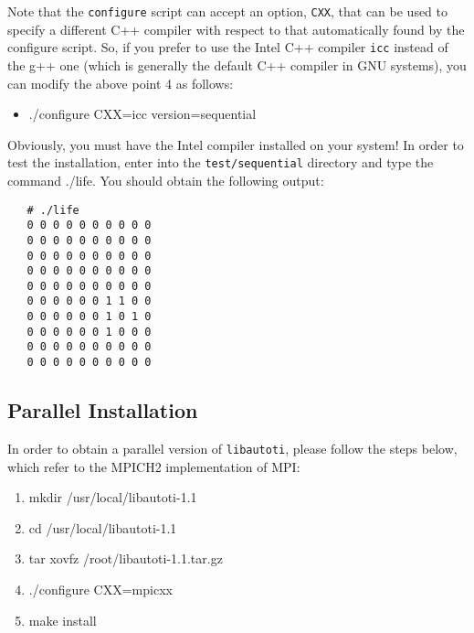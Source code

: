 Note that the \verb"configure" script can accept an option,
\verb"CXX", that can be used to specify a different C++ compiler
with respect to that automatically found by the configure script.
So, if you prefer to use the Intel C++ compiler \verb"icc" instead
of the g++ one (which is generally the default C++ compiler in GNU
systems), you can modify the above point 4 as follows:
\begin{itemize}
    \item ./configure CXX=icc version=sequential
\end{itemize}
Obviously, you must have the Intel compiler installed on your
system! In order to test the installation, enter into the
\verb"test/sequential" directory and type the command ./life. You
should obtain the following output:

\begin{verbatim}
   # ./life
   0 0 0 0 0 0 0 0 0 0
   0 0 0 0 0 0 0 0 0 0
   0 0 0 0 0 0 0 0 0 0
   0 0 0 0 0 0 0 0 0 0
   0 0 0 0 0 0 0 0 0 0
   0 0 0 0 0 0 1 1 0 0
   0 0 0 0 0 0 1 0 1 0
   0 0 0 0 0 0 1 0 0 0
   0 0 0 0 0 0 0 0 0 0
   0 0 0 0 0 0 0 0 0 0
\end{verbatim}

\subsection{Parallel Installation}\label{sec:parallel_installation}

In order to obtain a parallel version of \verb"libautoti", please
follow the steps below, which refer to the MPICH2 implementation
of MPI:

\begin{enumerate}

    \item mkdir /usr/local/libautoti-1.1

    \item cd /usr/local/libautoti-1.1

    \item tar xovfz /root/libautoti-1.1.tar.gz


    \item ./configure CXX=mpicxx

    \item make install

\end{enumerate}

